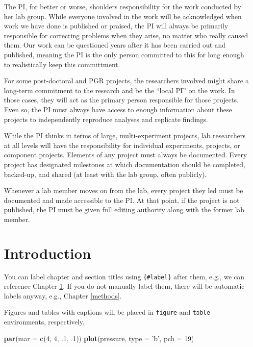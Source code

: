\documentclass[
]{book}
\newenvironment{Shaded}{\begin{snugshade}}{\end{snugshade}}
\newcommand{\DataTypeTok}[1]{\textcolor[rgb]{0.13,0.29,0.53}{#1}}
\newcommand{\DecValTok}[1]{\textcolor[rgb]{0.00,0.00,0.81}{#1}}
\newcommand{\FloatTok}[1]{\textcolor[rgb]{0.00,0.00,0.81}{#1}}
\newcommand{\KeywordTok}[1]{\textcolor[rgb]{0.13,0.29,0.53}{\textbf{#1}}}
\newcommand{\NormalTok}[1]{#1}
\newcommand{\StringTok}[1]{\textcolor[rgb]{0.31,0.60,0.02}{#1}}
\begin{document}
The PI, for better or worse, shoulders responsibility for the work conducted by her lab group. While everyone involved in the work will be acknowledged when work we have done is published or praised, the PI will always be primarily responsible for correcting problems when they arise, no matter who really caused them. Our work can be questioned years after it has been carried out and published, meaning the PI is the only person committed to this for long enough to realistically keep this committment.

For some post-doctoral and PGR projects, the researchers involved might share a long-term commitment to the research and be the ``local PI'' on the work. In those cases, they will act as the primary person responsible for those projects. Even so, the PI must always have access to enough information about these projects to independently reproduce analyses and replicate findings.

While the PI thinks in terms of large, multi-experiment projects, lab researchers at all levels will have the responsibility for individual experiments, projects, or component projects. Elements of any project must always be documented. Every project has designated milestones at which documentation should be completed, backed-up, and shared (at least with the lab group, often publicly).

Whenever a lab member moves on from the lab, every project they led must be documented and made accessible to the PI. At that point, if the project is not published, the PI must be given full editing authority along with the former lab member.

\hypertarget{intro}{%
\chapter{Introduction}\label{intro}}

You can label chapter and section titles using \texttt{\{\#label\}} after them, e.g., we can reference Chapter \ref{intro}. If you do not manually label them, there will be automatic labels anyway, e.g., Chapter \ref{methods}.

Figures and tables with captions will be placed in \texttt{figure} and \texttt{table} environments, respectively.

\begin{Shaded}
\begin{Highlighting}[]
\KeywordTok{par}\NormalTok{(}\DataTypeTok{mar =} \KeywordTok{c}\NormalTok{(}\DecValTok{4}\NormalTok{, }\DecValTok{4}\NormalTok{, }\FloatTok{.1}\NormalTok{, }\FloatTok{.1}\NormalTok{))}
\KeywordTok{plot}\NormalTok{(pressure, }\DataTypeTok{type =} \StringTok{'b'}\NormalTok{, }\DataTypeTok{pch =} \DecValTok{19}\NormalTok{)}
\end{Highlighting}
\end{Shaded}
\end{document}
